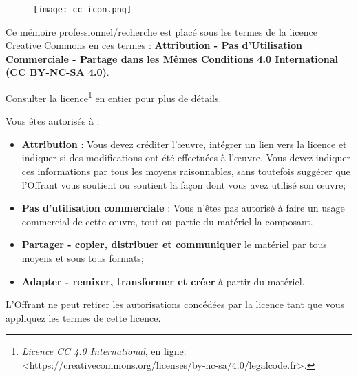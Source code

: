         \begin{figure}[H]
            \centering
            \texttt{[image: cc-icon.png]}
            \label{traitement}
        \end{figure}

    Ce mémoire professionnel/recherche est placé sous les termes de la licence Creative Commons en ces termes : \textbf{Attribution - Pas d'Utilisation Commerciale - Partage dans les Mêmes Conditions 4.0 International (CC BY-NC-SA 4.0)}.
\bigskip

    Consulter la \href{https://creativecommons.org/licenses/by-nc-sa/4.0/legalcode.fr}{licence\footnote{%
\textit{Licence CC 4.0 International}, en ligne: <\url{https://creativecommons.org/licenses/by-nc-sa/4.0/legalcode.fr}>.}} en entier pour plus de détails. 
\bigskip

    Vous êtes autorisés à :
    \begin{itemize}
        \item \textbf{Attribution} : Vous devez créditer l'\oe uvre, intégrer un lien vers la licence et indiquer si des modifications ont été effectuées à l'\oe uvre. Vous devez indiquer ces informations par tous les moyens raisonnables, sans toutefois suggérer que l'Offrant vous soutient ou soutient la façon dont vous avez utilisé son \oe uvre;
        \item \textbf{Pas d'utilisation commerciale} : Vous n'êtes pas autorisé à faire un usage commercial de cette \oe uvre, tout ou partie du matériel la composant. 
        \item \textbf{Partager - copier, distribuer et communiquer} le matériel par tous moyens et sous tous formats;
        \item \textbf{Adapter - remixer, transformer et créer} à partir du matériel.
    \end{itemize}
\bigskip

L'Offrant ne peut retirer les autorisations concédées par la licence tant que vous appliquez les termes de cette licence.

